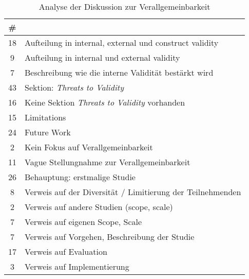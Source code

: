 \begin{table}[h!]
    \begin{tabular}{ c | p{14.5cm} }
        \# &  \\
        \hline
        18 & Aufteilung in internal, external und construct validity \\
        9  & Aufteilung in internal und external validity \\
        7 &  Beschreibung wie die interne Validität bestärkt wird \\
        \hline
        43 & Sektion: \textit{Threats to Validity} \\
        16 & Keine Sektion \textit{Threats to Validity} vorhanden\\
        \hline
        15 & Limitations \\
        24 & Future Work \\
        \hline
        2 &  Kein Fokus auf Verallgemeinbarkeit \\
        11 & Vague Stellungnahme zur Verallgemeinbarkeit \\
        26 & Behauptung: erstmalige Studie \\
        \hline
        8 & Verweis auf der Diversität / Limitierung der Teilnehmenden \\
        2 & Verweis auf andere Studien (scope, scale) \\
        7 & Verweis auf eigenen Scope, Scale \\
        7 & Verweis auf Vorgehen, Beschreibung der Studie \\
        17 & Verweis auf Evaluation \\
        3 & Verweis auf Implementierung \\
    \end{tabular}
    \caption{Analyse der Diskussion zur Verallgemeinbarkeit}
    \label{table:threats-of-validity}
\end{table}



